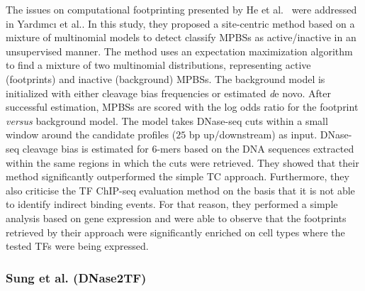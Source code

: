 The issues on computational footprinting presented by He et al.~\cite{he2014} were addressed in Yard{\i}mc{\i} et al.\cite{yardimci2014}. In this study, they proposed a site-centric method based on a mixture of multinomial models to detect classify MPBSs as active/inactive in an unsupervised manner. The method uses an expectation maximization algorithm to find a mixture of two multinomial distributions, representing active (footprints) and inactive (background) MPBSs. The background model is initialized with either cleavage bias frequencies or estimated {\emph de novo}. After successful estimation, MPBSs are scored with the log odds ratio for the footprint \emph{versus} background model. The model takes DNase-seq cuts within a small window around the candidate profiles ($25$ bp up/downstream) as input. DNase-seq cleavage bias is estimated for 6-mers based on the DNA sequences extracted within the same regions in which the cuts were retrieved. They showed that their method significantly outperformed the simple TC approach. Furthermore, they also criticise the TF ChIP-seq evaluation method on the basis that it is not able to identify indirect binding events. For that reason, they performed a simple analysis based on gene expression and were able to observe that the footprints retrieved by their approach were significantly enriched on cell types where the tested TFs were being expressed.

\subsubsection{Sung et al. (DNase2TF)}
\label{sec:sung.2}

